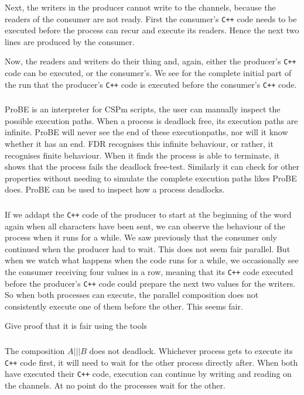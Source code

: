 \documentclass[a4paper,twoside,11pt]{article}
\newcommand{\cpp}{{\tt C++} }
\begin{document}
Next, the writers in the producer cannot write to the channels, because the readers of the consumer are not ready. First the consumer's \cpp code needs to be executed before the process can recur and execute its readers. Hence the next two lines are produced by the consumer.

Now, the readers and writers do their thing and, again, either the producer's \cpp code can be executed, or the consumer's. We see for the complete initial part of the run that the producer's \cpp code is executed before the consumer's \cpp code.

\subsubsection{}
ProBE is an interpreter for CSPm scripts, the user can manually inspect the possible execution paths. When a process is deadlock free, its execution paths are infinite. ProBE will never see the end of these executionpaths, nor will it know whether it has an end. FDR recognises this infinite behaviour, or rather, it recognises finite behaviour. When it finds the process is able to terminate, it shows that the process fails the deadlock free-test. Similarly it can check for other properties without needing to simulate the complete execution paths likes ProBE does. ProBE can be used to inspect how a process deadlocks.

\subsubsection{}
If we addapt the \cpp code of the producer to start at the beginning of the word again when all characters have been sent, we can observe the behaviour of the process when it runs for a while. We saw previously that the consumer only continued when the producer had to wait. This does not seem fair parallel. But when we watch what happens when the code runs for a while, we occasionally see the consumer receiving four values in a row, meaning that its \cpp code executed before the producer's \cpp code could prepare the next two values for the writers. So when both processes can execute, the parallel composition does not consistently execute one of them before the other. This seems fair.

\color{red}
Give proof that it is fair using the tools
\color{black}

\subsubsection{}
The composition $A ||| B$ does not deadlock. Whichever process gets to execute its \cpp code first, it will need to wait for the other process directly after. When both have executed their \cpp code, execution can continue by writing and reading on the channels. At no point do the processes wait for the other.
\end{document}

